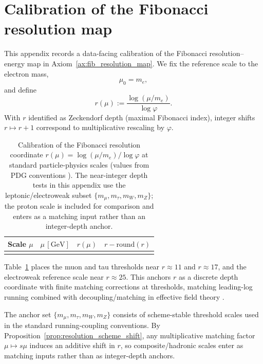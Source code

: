 \section{Calibration of the Fibonacci resolution map}
\label{app:resolution_map_calibration}

This appendix records a data-facing calibration of the Fibonacci resolution--energy map in Axiom~\ref{ax:fib_resolution_map}. We fix the reference scale to the electron mass,
\begin{equation}
\mu_0=m_e,
\end{equation}
and define
\begin{equation}
r(\mu):=\frac{\log(\mu/m_e)}{\log\varphi}.
\end{equation}
With $r$ identified as Zeckendorf depth (maximal Fibonacci index), integer shifts $r\mapsto r+1$ correspond to multiplicative rescaling by $\varphi$.

\begin{table}[t]
\centering
\begin{tabular}{@{}lrrr@{}}
\toprule
Scale $\mu$ & $\mu\,[\mathrm{GeV}]$ & $r(\mu)$ & $r-\mathrm{round}(r)$ \\
\midrule
%
\\
\bottomrule
\end{tabular}
\caption{Calibration of the Fibonacci resolution coordinate $r(\mu)=\log(\mu/m_e)/\log\varphi$ at standard particle-physics scales (values from PDG conventions \cite{PDGRPP2024}). The near-integer depth tests in this appendix use the leptonic/electroweak subset $\{m_\mu,m_\tau,m_W,m_Z\}$; the proton scale is included for comparison and enters as a matching input rather than an integer-depth anchor.}
\label{tab:resolution_map_calibration}
\end{table}

Table~\ref{tab:resolution_map_calibration} places the muon and tau thresholds near $r\approx 11$ and $r\approx 17$, and the electroweak reference scale near $r\approx 25$. This anchors $r$ as a discrete depth coordinate with finite matching corrections at thresholds, matching leading-log running combined with decoupling/matching in effective field theory \cite{AppelquistCarazzone1975,PeskinSchroeder1995,PDGRPP2024}.

The anchor set $\{m_\mu,m_\tau,m_W,m_Z\}$ consists of scheme-stable threshold scales used in the standard running-coupling conventions. By Proposition~\ref{prop:resolution_scheme_shift}, any multiplicative matching factor $\mu\mapsto s\mu$ induces an additive shift in $r$, so composite/hadronic scales enter as matching inputs rather than as integer-depth anchors.

